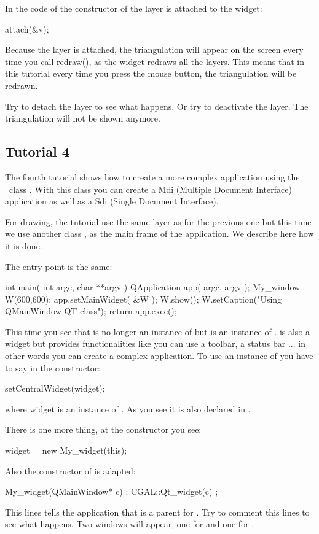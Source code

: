 In the code of the constructor of  the layer is attached to
the widget:
\begin{ccExampleCode}
attach(&v);
\end{ccExampleCode}
Because the layer is attached, the triangulation will appear on the
screen every time you call redraw(), as the widget redraws all the
layers. This means that in this tutorial every time you press the mouse
button, the triangulation will be redrawn.

Try to detach the layer to see what happens. Or try to deactivate
the layer. The triangulation will not be shown anymore.

\subsection*{Tutorial 4}

The fourth tutorial shows how to create a more complex application
using the \qt\ class . With this class you can create a
{\sc Mdi} (Multiple Document Interface) application as well as a {\sc
Sdi} (Single Document Interface).

For drawing, the tutorial use the same layer as for the previous one
but this time we use another class , as the main frame of
the application. We describe here how it is done.

The entry point is the same:
\begin{ccExampleCode}
int main( int argc, char **argv )
{
    QApplication app( argc, argv );
    My_window W(600,600);
    app.setMainWidget( &W );
    W.show();
    W.setCaption("Using QMainWindow QT class");
    return app.exec();
}
\end{ccExampleCode}
This time you see that  is no longer an instance of
 but is an instance of
.  is also a widget but
provides functionalities like you can use a toolbar, a status bar ... in other
words you can create a complex application. To use an instance of
 you have to say in the constructor:
\begin{ccExampleCode}
setCentralWidget(widget);
\end{ccExampleCode}
where widget is an instance of . As you see it is
also declared in .

There is one more thing, at the constructor you see:
\begin{ccExampleCode}
widget = new My_widget(this);
\end{ccExampleCode}
Also the constructor of  is adapted:
\begin{ccExampleCode}
My_widget(QMainWindow* c) : CGAL::Qt_widget(c) {};
\end{ccExampleCode}
This lines tells the application that  is a parent for
. Try to comment this lines to see what happens. Two
windows will appear, one for  and one for .

